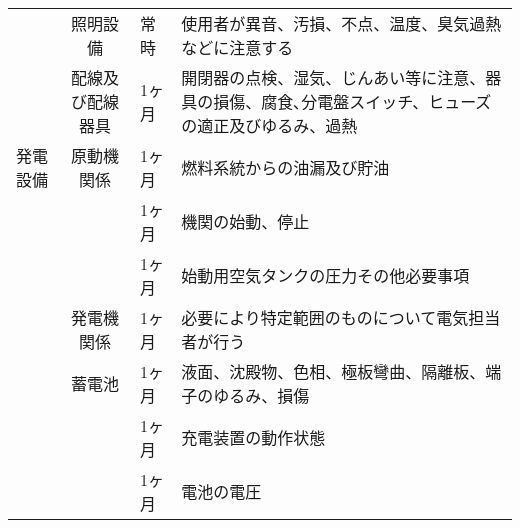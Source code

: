 \documentclass[10pt,a4paper,uplatex]{jsarticle}
\begin{document}
\begin{table}[!b]
\begin{tabular}{|l|c|p{1cm}|p{10cm}|}
    &照明設備        & 常時 & 使用者が異音、汚損、不点、温度、臭気過熱などに注意する  \\\cline{2-4}
    &配線及び配線器具   & 1ヶ月 & 開閉器の点検、湿気、じんあい等に注意、器具の損傷、腐食､分電盤スイッチ、ヒューズの適正及びゆるみ、過熱\\ \cline{2-4}
    \hline  
発電設備
    &原動機関係     & 1ヶ月 & 燃料系統からの油漏及び貯油  \\
    &              & 1ヶ月 & 機関の始動、停止  \\ 
    &              & 1ヶ月 & 始動用空気タンクの圧力その他必要事項  \\ \cline{2-4}
    &発電機関係      & 1ヶ月 &必要により特定範囲のものについて電気担当者が行う  \\ \cline{2-4}
    &蓄電池         & 1ヶ月 & 液面、沈殿物、色相、極板彎曲、隔離板、端子のゆるみ、損傷  \\
    &              & 1ヶ月 & 充電装置の動作状態  \\
    &              & 1ヶ月 & 電池の電圧\\\cline{2-4}\hline  
  \end{tabular}
\end{table}
\end{document}
